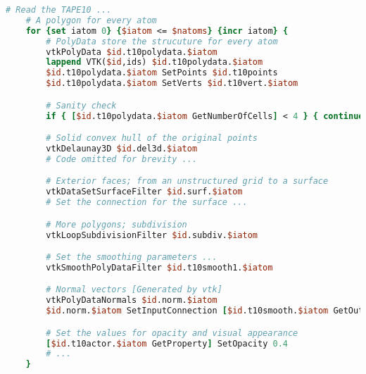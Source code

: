 
\begin{lstlisting}[language=tcl]
    # Read the TAPE10 ...
    # A polygon for every atom
    for {set iatom 0} {$iatom <= $natoms} {incr iatom} {
        # PolyData store the strucuture for every atom
        vtkPolyData $id.t10polydata.$iatom
        lappend VTK($id,ids) $id.t10polydata.$iatom
        $id.t10polydata.$iatom SetPoints $id.t10points
        $id.t10polydata.$iatom SetVerts $id.t10vert.$iatom

        # Sanity check
        if { [$id.t10polydata.$iatom GetNumberOfCells] < 4 } { continue }

        # Solid convex hull of the original points
        vtkDelaunay3D $id.del3d.$iatom
        # Code omitted for brevity ... 

        # Exterior faces; from an unstructured grid to a surface
        vtkDataSetSurfaceFilter $id.surf.$iatom
        # Set the connection for the surface ...

        # More polygons; subdivision
        vtkLoopSubdivisionFilter $id.subdiv.$iatom

        # Set the smoothing parameters ...
        vtkSmoothPolyDataFilter $id.t10smooth1.$iatom

        # Normal vectors [Generated by vtk]
        vtkPolyDataNormals $id.norm.$iatom
        $id.norm.$iatom SetInputConnection [$id.t10smooth.$iatom GetOutputPort]

        # Set the values for opacity and visual appearance
        [$id.t10actor.$iatom GetProperty] SetOpacity 0.4
        # ...
    }
\end{lstlisting}

